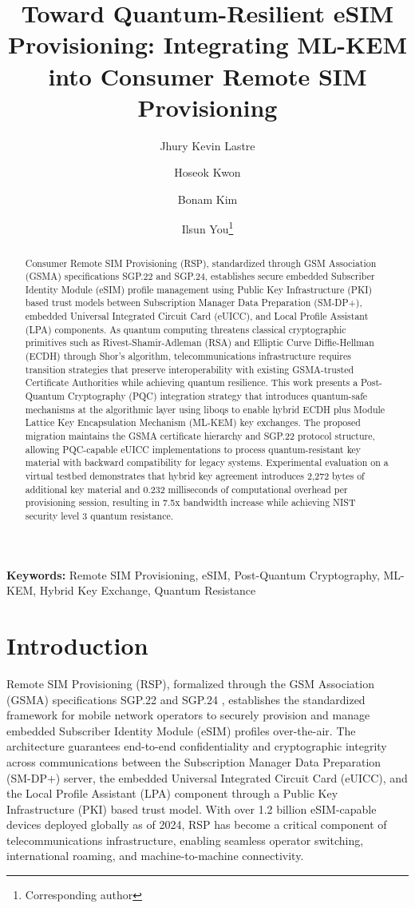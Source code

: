 \documentclass{easychair}
\title{Toward Quantum-Resilient eSIM Provisioning: Integrating ML-KEM into Consumer Remote SIM Provisioning}
\author{
  Jhury Kevin Lastre \and
  Hoseok Kwon \and
  Bonam Kim \and
  Ilsun You\thanks{Corresponding author}
}
\institute{
  Kookmin University, Seoul, South Korea \\
  \email{lavelliane@kookmin.ac.kr, hoseok1997@kookmin.ac.kr, kimbona@kookmin.ac.kr, isyou@kookmin.ac.kr}
}
\begin{document}
\maketitle

\begin{abstract}
Consumer Remote SIM Provisioning (RSP), standardized through GSM Association (GSMA) specifications SGP.22 and SGP.24, establishes secure embedded Subscriber Identity Module (eSIM) profile management using Public Key Infrastructure (PKI) based trust models between Subscription Manager Data Preparation (SM-DP+), embedded Universal Integrated Circuit Card (eUICC), and Local Profile Assistant (LPA) components. As quantum computing threatens classical cryptographic primitives such as Rivest-Shamir-Adleman (RSA) and Elliptic Curve Diffie-Hellman (ECDH) through Shor's algorithm, telecommunications infrastructure requires transition strategies that preserve interoperability with existing GSMA-trusted Certificate Authorities while achieving quantum resilience. This work presents a Post-Quantum Cryptography (PQC) integration strategy that introduces quantum-safe mechanisms at the algorithmic layer using liboqs to enable hybrid ECDH plus Module Lattice Key Encapsulation Mechanism (ML-KEM) key exchanges. The proposed migration maintains the GSMA certificate hierarchy and SGP.22 protocol structure, allowing PQC-capable eUICC implementations to process quantum-resistant key material with backward compatibility for legacy systems. Experimental evaluation on a virtual testbed demonstrates that hybrid key agreement introduces 2,272 bytes of additional key material and 0.232 milliseconds of computational overhead per provisioning session, resulting in 7.5x bandwidth increase while achieving NIST security level 3 quantum resistance.
\end{abstract}

\textbf{Keywords:} Remote SIM Provisioning, eSIM, Post-Quantum Cryptography, ML-KEM, Hybrid Key Exchange, Quantum Resistance

\section{Introduction}

Remote SIM Provisioning (RSP), formalized through the GSM Association (GSMA) specifications SGP.22 and SGP.24 \cite{GSMA_SGP22,GSMA_SGP24}, establishes the standardized framework for mobile network operators to securely provision and manage embedded Subscriber Identity Module (eSIM) profiles over-the-air. The architecture guarantees end-to-end confidentiality and cryptographic integrity across communications between the Subscription Manager Data Preparation (SM-DP+) server, the embedded Universal Integrated Circuit Card (eUICC), and the Local Profile Assistant (LPA) component through a Public Key Infrastructure (PKI) based trust model. With over 1.2 billion eSIM-capable devices deployed globally as of 2024, RSP has become a critical component of telecommunications infrastructure, enabling seamless operator switching, international roaming, and machine-to-machine connectivity.
\end{document}
